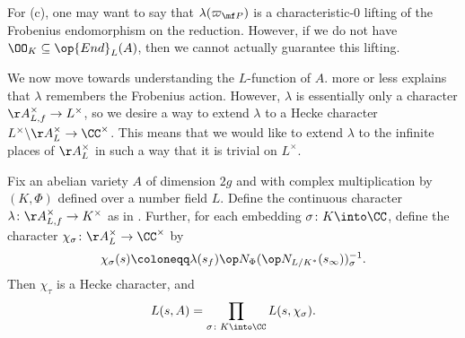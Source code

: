\documentclass[../thesis.tex]{subfiles}
\begin{document}
\begin{remark}
	For (c), one may want to say that $\lambda(\varpi_{\mf P})$ is a characteristic-$0$ lifting of the Frobenius endomorphism on the reduction. However, if we do not have $\OO_K\subseteq\op{End}_L(A)$, then we cannot actually guarantee this lifting.
\end{remark}
We now move towards understanding the $L$-function of $A$.  more or less explains that $\lambda$ remembers the Frobenius action. However, $\lambda$ is essentially only a character $\AA_{L,f}^\times\to L^\times$, so we desire a way to extend $\lambda$ to a Hecke character $L^\times\backslash\AA_L^\times\to\CC^\times$. This means that we would like to extend $\lambda$ to the infinite places of $\AA_L^\times$ in such a way that it is trivial on $L^\times$.
\begin{proposition} \label{prop:fundamental-l-func}
	Fix an abelian variety $A$ of dimension $2g$ and with complex multiplication by $(K,\Phi)$ defined over a number field $L$. Define the continuous character $\lambda\colon\AA_{L,f}^\times\to K^\times$ as in . Further, for each embedding $\sigma\colon K\into\CC$, define the character $\chi_\sigma\colon\AA_L^\times\to\CC^\times$ by
	\[\chi_\sigma(s)\coloneqq\lambda(s_f)\op N_\Phi(\op N_{L/K^*}(s_\infty))_\sigma^{-1}.\]
	Then $\chi_\tau$ is a Hecke character, and
	\[L(s,A)=\prod_{\sigma\colon K\into\CC}L(s,\chi_\sigma).\]
\end{proposition}
\end{document}
